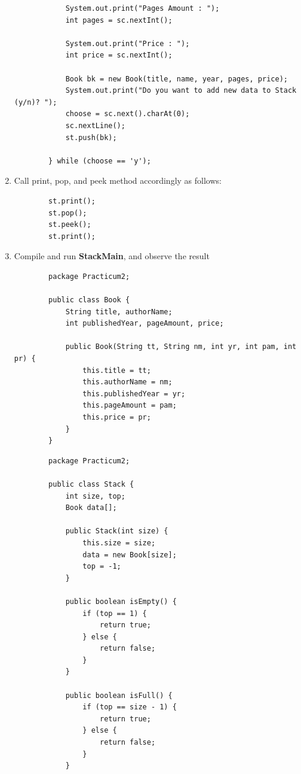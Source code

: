 \documentclass[12pt,titlepage]{article}
\begin{document}
\begin{enumerate}
\begin{verbatim}
            System.out.print("Pages Amount : ");
            int pages = sc.nextInt();

            System.out.print("Price : ");
            int price = sc.nextInt();

            Book bk = new Book(title, name, year, pages, price);
            System.out.print("Do you want to add new data to Stack (y/n)? ");
            choose = sc.next().charAt(0);
            sc.nextLine();
            st.push(bk);

        } while (choose == 'y');
    \end{verbatim}
    \item Call print, pop, and peek method accordingly as follows:
    \begin{verbatim}
        st.print();
        st.pop();
        st.peek();
        st.print();
    \end{verbatim}
    \item Compile and run \textbf{StackMain}, and observe the result
    \begin{verbatim}
        package Practicum2;

        public class Book {
            String title, authorName;
            int publishedYear, pageAmount, price;

            public Book(String tt, String nm, int yr, int pam, int pr) {
                this.title = tt;
                this.authorName = nm;
                this.publishedYear = yr;
                this.pageAmount = pam;
                this.price = pr;
            }
        }
    \end{verbatim}
    \begin{verbatim}
        package Practicum2;

        public class Stack {
            int size, top;
            Book data[];

            public Stack(int size) {
                this.size = size;
                data = new Book[size];
                top = -1;
            }

            public boolean isEmpty() {
                if (top == 1) {
                    return true;
                } else {
                    return false;
                }
            }

            public boolean isFull() {
                if (top == size - 1) {
                    return true;
                } else {
                    return false;
                }
            }


\end{verbatim}
\end{enumerate}
\end{document}
